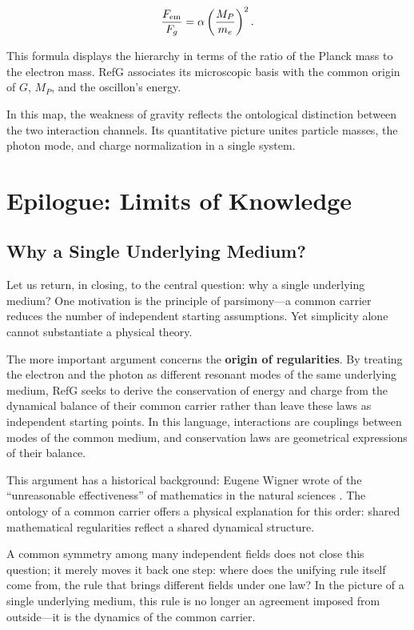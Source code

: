 \documentclass[11pt,a4paper]{article}
\begin{document}
\begin{equation}
\frac{F_{\rm em}}{F_g}=\alpha\left(\frac{M_P}{m_e}\right)^2.
\label{eq:force-hierarchy}
\end{equation}

This formula displays the hierarchy in terms of the ratio of the Planck mass to the electron mass. RefG associates its microscopic basis with the common origin of $G$, $M_P$, and the oscillon's energy.

In this map, the weakness of gravity reflects the ontological distinction between the two interaction channels. Its quantitative picture unites particle masses, the photon mode, and charge normalization in a single system.

\section{Epilogue: Limits of Knowledge}

\subsection{Why a Single Underlying Medium?}

Let us return, in closing, to the central question: why a single underlying medium? One motivation is the principle of parsimony---a common carrier reduces the number of independent starting assumptions. Yet simplicity alone cannot substantiate a physical theory.

The more important argument concerns the \textbf{origin of regularities}. By treating the electron and the photon as different resonant modes of the same underlying medium, RefG seeks to derive the conservation of energy and charge from the dynamical balance of their common carrier rather than leave these laws as independent starting points. In this language, interactions are couplings between modes of the common medium, and conservation laws are geometrical expressions of their balance.

This argument has a historical background: Eugene Wigner wrote of the “unreasonable effectiveness” of mathematics in the natural sciences \citep{wigner1960}. The ontology of a common carrier offers a physical explanation for this order: shared mathematical regularities reflect a shared dynamical structure.

A common symmetry among many independent fields does not close this question; it merely moves it back one step: where does the unifying rule itself come from, the rule that brings different fields under one law? In the picture of a single underlying medium, this rule is no longer an agreement imposed from outside---it is the dynamics of the common carrier.
\end{document}
